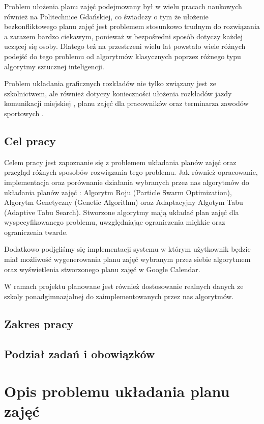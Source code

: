 \documentclass[11pt]{report}
\begin{document}
\par Problem ułożenia planu zajęć podejmowany był w wielu pracach naukowych również na Politechnice Gdańskiej, co świadczy o tym że ułożenie bezkonfliktowego planu zajęć jest problemem stosunkowo trudnym do rozwiązania a zarazem bardzo ciekawym, ponieważ w bezpośredni sposób dotyczy każdej uczącej się osoby. Dlatego też na przestrzeni wielu lat powstało wiele różnych podejść do tego problemu od algorytmów klasycznych poprzez różnego typu algorytmy sztucznej inteligencji.
\par Problem układania graficznych rozkładów nie tylko związany jest ze szkolnictwem, ale również dotyczy konieczności ułożenia rozkładów jazdy komunikacji miejskiej \cite{com}
, planu zajęć dla pracowników \cite{worker} oraz terminarza zawodów sportowych \cite{sport}.
\section{Cel pracy}
\par Celem pracy jest zapoznanie się z problemem układania planów zajęć oraz przegląd różnych sposobów rozwiązania tego problemu. Jak również opracowanie, implementacja oraz porównanie działania wybranych przez nas algorytmów do układania planów zajęć : Algorytm Roju (Particle Swarm Optimization), Algorytm Genetyczny (Genetic Algorithm) oraz Adaptacyjny Algotym Tabu (Adaptive Tabu Search). Stworzone algorytmy mają układać plan zajęć dla wyspecyfikowanego problemu, uwzględniając ograniczenia miękkie oraz ograniczenia twarde. 
\par Dodatkowo podjęliśmy się implementacji systemu w którym użytkownik będzie miał możliwość wygenerowania planu zajęć wybranym przez siebie algorytmem oraz wyświetlenia stworzonego planu zajęć w Google Calendar.
\par W ramach projektu planowane jest również dostosowanie realnych danych ze szkoly ponadgimnazjalnej do zaimplementowanych przez nas algorytmów.
\section{Zakres pracy}
\section{Podział zadań i obowiązków}
\chapter{Opis problemu układania planu zajęć}
\end{document}
